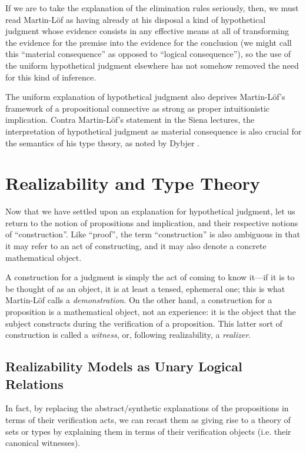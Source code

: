 \documentclass[11pt]{amsart}
\theoremstyle{definition}
\theoremstyle{remark}
\numberwithin{equation}{section}
\begin{document}
If we are to take the explanation of the elimination rules seriously, then, we
must read Martin-L\"of as having already at his disposal a kind of hypothetical
judgment whose evidence consists in any effective means at all of transforming
the evidence for the premise into the evidence for the conclusion (we might call
this ``material consequence'' as opposed to ``logical consequence''), so the use
of the uniform hypothetical judgment elsewhere has not somehow removed the need
for this kind of inference.

The uniform explanation of hypothetical judgment also deprives Martin-L\"of's
framework of a propositional connective as strong as proper intuitionistic
implication. Contra Martin-L\"of's statement in the Siena lectures, the
interpretation of hypothetical judgment as material consequence is also crucial
for the semantics of his type theory, as noted by Dybjer \cite{dybjer:testing}.

\section{Realizability and Type Theory}

Now that we have settled upon an explanation for hypothetical judgment, let us
return to the notion of propositions and implication, and their respective
notions of ``construction''. Like ``proof'', the term ``construction'' is also
ambiguous in that it may refer to an act of constructing, and it may also denote
a concrete mathematical object.

A construction for a judgment is simply the act of coming to know it---if it is
to be thought of as an object, it is at least a tensed, ephemeral one; this is
what Martin-L\"of calls a \emph{demonstration}. On the other hand, a
construction for a proposition is a mathematical object, not an experience: it
is the object that the subject constructs during the verification of a
proposition. This latter sort of construction is called a \emph{witness}, or,
following realizability, a \emph{realizer}.

\subsection{Realizability Models as Unary Logical Relations}

In fact, by replacing the abstract/synthetic explanations of the propositions in
terms of their verification acts, we can recast them as giving rise to a theory
of sets or types by explaining them in terms of their verification objects (i.e.
their canonical witnesses).
\end{document}
